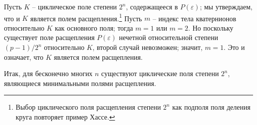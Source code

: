 \documentclass[11pt]{article}
\begin{document}
Пусть $K$ -- циклическое поле степени $2^n$, содержащееся в $P(\varepsilon)$; мы утверждаем, что и $K$ является полем расщепления.\footnote{Выбор циклического поля расщепления степени $2^n$ как подполя поля деления круга повторяет пример Хассе.} Пусть $m$ -- индекс тела кватернионов относительно $K$ как основного поля; тогда $m=1$ или $m=2$. Но поскольку существует поле расщепления $P(\varepsilon)$ нечетной относительной степени $(p-1)/2^n$ относительно $K$, второй случай невозможен; значит, $m=1$. Это и означает, что $K$ является полем расщепления.

Итак, для бесконечно многих $n$ существуют циклические поля степени $2^n$, являющиеся минимальными полями расщепления.
\end{document}
